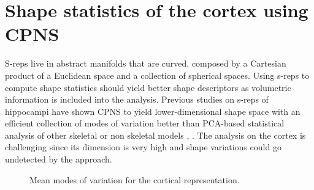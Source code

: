 \section{Shape statistics of the cortex using CPNS}
\label{sec:Statistics}

S-reps live in abstract manifolds that are curved,
composed by a Cartesian product of a Euclidean space and a collection of spherical spaces.
Using s-reps to compute shape statistics should yield better shape descriptors as volumetric information
is included into the analysis. 
Previous studies on s-reps of hippocampi have shown 
CPNS to yield lower-dimensional shape space with an efficient collection of modes of variation better than 
PCA-based statistical analysis of other skeletal or non skeletal models \cite{pizer_nested_2012}, \cite{schulz_2012}.
The analysis on the cortex is challenging since its dimension is very high and shape variations could go undetected
by the approach.

\begin{figure}[tb]
  \centering
  \caption[Mean modes of variation for the cortex.]{Mean modes of variation for the cortical representation.}
  \label{fig:Modes}   
\end{figure}


